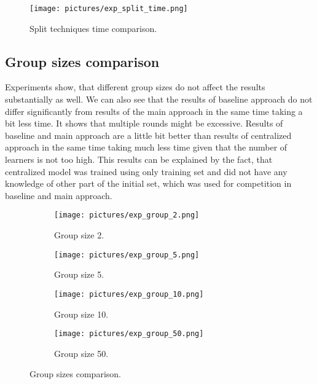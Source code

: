 \documentclass{scrartcl}
\begin{document}
\begin{figure}[H]
  \begin{center}
  \texttt{[image: pictures/exp\_split\_time.png]}
    \end{center}
  \caption{Split techniques time comparison.}
  \label{fig:splits_time}
\end{figure}
\subsection{Group sizes comparison}
Experiments show, that different group sizes do not affect the results substantially as well. We can also see that the results of baseline approach do not differ significantly from results of the main approach in the same time taking a bit less time. It shows that multiple rounds might be excessive. Results of baseline and main approach are a little bit better than results of centralized approach in the same time taking much less time given that the number of learners is not too high. This results can be explained by the fact, that centralized model was trained using only training set and did not have any knowledge of other part of the initial set, which was used for competition in baseline and main approach.

\begin{figure}[H]
  \centering
  \begin{subfigure}[b]{0.45\linewidth}
    \texttt{[image: pictures/exp\_group\_2.png]}
    \caption{Group size 2.}
  \end{subfigure}\hfill%
  \begin{subfigure}[b]{0.45\linewidth}
    \texttt{[image: pictures/exp\_group\_5.png]}
    \caption{Group size 5.}
  \end{subfigure}
    \begin{subfigure}[b]{0.45\linewidth}
    \texttt{[image: pictures/exp\_group\_10.png]}
    \caption{Group size 10.}
  \end{subfigure}\hfill%
      \begin{subfigure}[b]{0.45\linewidth}
    \texttt{[image: pictures/exp\_group\_50.png]}
    \caption{Group size 50.}
  \end{subfigure}
  \caption{ Group sizes comparison.}
  \label{fig:groups}
\end{figure}
\end{document}
